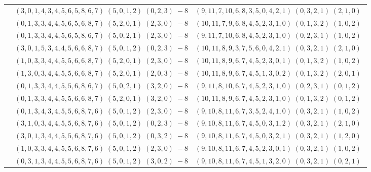 \documentclass[11pt]{article}
\begin{document}
\begin{longtable}[l]{|c|c|c|}
 \cline{2-3} 
 & $(3 ,0 ,1 ,4 ,3 ,4 ,5 ,6 ,5 ,8 ,6 ,7) \;(5 ,0 ,1 ,2) \;(0 ,2 ,3) \;-8$ & $(9 ,11 ,7 ,10 ,6 ,8 ,3 ,5 ,0 ,4 ,2 ,1) \;(0 ,3 ,2 ,1) \;(2 ,1 ,0) \;$\\ 
 \cline{2-3} 
 & $(0 ,1 ,3 ,3 ,4 ,4 ,5 ,6 ,5 ,6 ,8 ,7) \;(5 ,2 ,0 ,1) \;(2 ,3 ,0) \;-8$ & $(10 ,11 ,7 ,9 ,6 ,8 ,4 ,5 ,2 ,3 ,1 ,0) \;(0 ,1 ,3 ,2) \;(1 ,0 ,2) \;$\\ 
 \cline{2-3} 
 & $(0 ,1 ,3 ,3 ,4 ,4 ,5 ,6 ,5 ,8 ,6 ,7) \;(5 ,0 ,2 ,1) \;(2 ,3 ,0) \;-8$ & $(9 ,11 ,7 ,10 ,6 ,8 ,4 ,5 ,2 ,3 ,1 ,0) \;(0 ,2 ,3 ,1) \;(1 ,0 ,2) \;$\\ 
 \cline{2-3} 
 & $(3 ,0 ,1 ,5 ,3 ,4 ,4 ,5 ,6 ,6 ,8 ,7) \;(5 ,0 ,1 ,2) \;(0 ,2 ,3) \;-8$ & $(10 ,11 ,8 ,9 ,3 ,7 ,5 ,6 ,0 ,4 ,2 ,1) \;(0 ,3 ,2 ,1) \;(2 ,1 ,0) \;$\\ 
 \cline{2-3} 
 & $(1 ,0 ,3 ,3 ,4 ,4 ,5 ,5 ,6 ,6 ,8 ,7) \;(5 ,2 ,0 ,1) \;(2 ,3 ,0) \;-8$ & $(10 ,11 ,8 ,9 ,6 ,7 ,4 ,5 ,2 ,3 ,0 ,1) \;(0 ,1 ,3 ,2) \;(1 ,0 ,2) \;$\\ 
 \cline{2-3} 
 & $(1 ,3 ,0 ,3 ,4 ,4 ,5 ,5 ,6 ,6 ,8 ,7) \;(5 ,2 ,0 ,1) \;(2 ,0 ,3) \;-8$ & $(10 ,11 ,8 ,9 ,6 ,7 ,4 ,5 ,1 ,3 ,0 ,2) \;(0 ,1 ,3 ,2) \;(2 ,0 ,1) \;$\\ 
 \cline{2-3} 
 & $(0 ,1 ,3 ,3 ,4 ,4 ,5 ,5 ,6 ,8 ,6 ,7) \;(5 ,0 ,2 ,1) \;(3 ,2 ,0) \;-8$ & $(9 ,11 ,8 ,10 ,6 ,7 ,4 ,5 ,2 ,3 ,1 ,0) \;(0 ,2 ,3 ,1) \;(0 ,1 ,2) \;$\\ 
 \cline{2-3} 
 & $(0 ,1 ,3 ,3 ,4 ,4 ,5 ,5 ,6 ,6 ,8 ,7) \;(5 ,2 ,0 ,1) \;(3 ,2 ,0) \;-8$ & $(10 ,11 ,8 ,9 ,6 ,7 ,4 ,5 ,2 ,3 ,1 ,0) \;(0 ,1 ,3 ,2) \;(0 ,1 ,2) \;$\\ 
 \cline{2-3} 
 & $(0 ,1 ,3 ,4 ,3 ,4 ,5 ,5 ,6 ,8 ,7 ,6) \;(5 ,0 ,1 ,2) \;(2 ,3 ,0) \;-8$ & $(9 ,10 ,8 ,11 ,6 ,7 ,3 ,5 ,2 ,4 ,1 ,0) \;(0 ,3 ,2 ,1) \;(1 ,0 ,2) \;$\\ 
 \cline{2-3} 
 & $(3 ,1 ,0 ,3 ,4 ,4 ,5 ,5 ,6 ,8 ,7 ,6) \;(5 ,0 ,1 ,2) \;(0 ,2 ,3) \;-8$ & $(9 ,10 ,8 ,11 ,6 ,7 ,4 ,5 ,0 ,3 ,1 ,2) \;(0 ,3 ,2 ,1) \;(2 ,1 ,0) \;$\\ 
 \cline{2-3} 
 & $(3 ,0 ,1 ,3 ,4 ,4 ,5 ,5 ,6 ,8 ,7 ,6) \;(5 ,0 ,1 ,2) \;(0 ,3 ,2) \;-8$ & $(9 ,10 ,8 ,11 ,6 ,7 ,4 ,5 ,0 ,3 ,2 ,1) \;(0 ,3 ,2 ,1) \;(1 ,2 ,0) \;$\\ 
 \cline{2-3} 
 & $(1 ,0 ,3 ,3 ,4 ,4 ,5 ,5 ,6 ,8 ,7 ,6) \;(5 ,0 ,1 ,2) \;(2 ,3 ,0) \;-8$ & $(9 ,10 ,8 ,11 ,6 ,7 ,4 ,5 ,2 ,3 ,0 ,1) \;(0 ,3 ,2 ,1) \;(1 ,0 ,2) \;$\\ 
 \cline{2-3} 
 & $(0 ,3 ,1 ,3 ,4 ,4 ,5 ,5 ,6 ,8 ,7 ,6) \;(5 ,0 ,1 ,2) \;(3 ,0 ,2) \;-8$ & $(9 ,10 ,8 ,11 ,6 ,7 ,4 ,5 ,1 ,3 ,2 ,0) \;(0 ,3 ,2 ,1) \;(0 ,2 ,1) \;$\\ 

\end{longtable}
\end{document}
